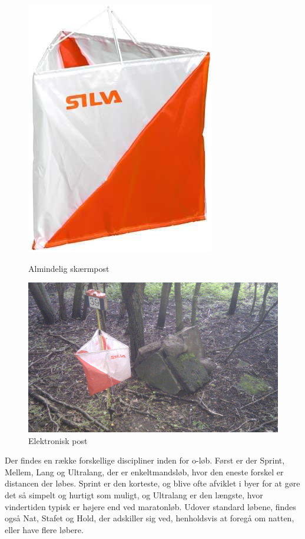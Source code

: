 \begin{figure}
	\centering
	\begin{minipage}{.5\textwidth}
		\centering
		\includegraphics[width=.5\linewidth]{billeder/o-skaerm}
		\caption{Almindelig skærmpost}
		\label{fig:test1}
	\end{minipage}%
	\begin{minipage}{.5\textwidth}
		\centering
		\includegraphics[width=1.0\linewidth]{billeder/banelaeggerkreativitet}
		\caption{Elektronisk post}
		\label{fig:test2}
	\end{minipage}
\end{figure}
Der findes en række forskellige discipliner inden for o-løb. Først er der Sprint, Mellem, Lang og Ultralang, der er enkeltmandsløb, hvor den eneste forskel er distancen der løbes. Sprint er den korteste, og blive ofte afviklet i byer for at gøre det så simpelt og hurtigt som muligt, og Ultralang er den længste, hvor vindertiden typisk er højere end ved maratonløb. Udover standard løbene, findes også Nat, Stafet og Hold, der adskiller sig ved, henholdsvis at foregå om natten, eller have flere løbere. 
